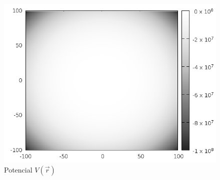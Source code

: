 \documentclass[a4paper,11pt]{exam}
\begin{document}
	\begin{figure}[h]
		\centering
		\includegraphics[scale=0.6]{Pot.png}
		\caption{Potencial $V(\vec{r})$}
	\end{figure}
	
	
	
\end{document}

